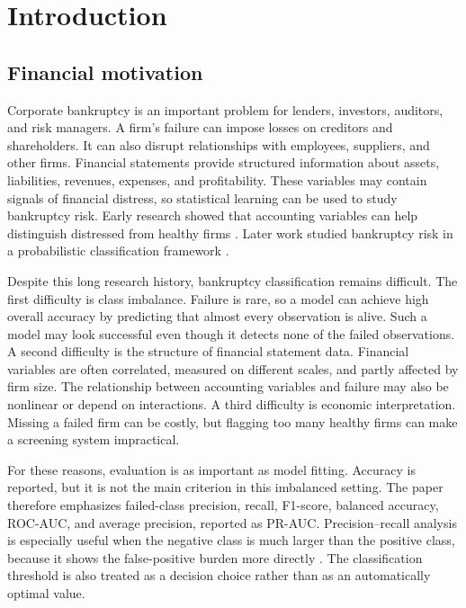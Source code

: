 \documentclass[11pt,a4paper]{article}
\begin{document}
\clearpage
\begingroup
\small
\setlength{\parskip}{0pt}
\tableofcontents
\endgroup
\clearpage
{}

\section{Introduction}
\label{sec:introduction}

\subsection{Financial motivation}

Corporate bankruptcy is an important problem for lenders, investors, auditors,
and risk managers. A firm's failure can impose losses on creditors and
shareholders. It can also disrupt relationships with employees, suppliers, and
other firms. Financial statements provide structured information about assets,
liabilities, revenues, expenses, and profitability. These variables may contain
signals of financial distress, so statistical learning can be used to study
bankruptcy risk. Early research showed
that accounting variables can help distinguish distressed from healthy firms
\citep{altman1968}. Later work studied bankruptcy risk in a probabilistic
classification framework \citep{ohlson1980}.

Despite this long research history, bankruptcy classification remains difficult.
The first difficulty is class imbalance. Failure is rare, so a model can achieve
high overall accuracy by predicting that almost every observation is alive. Such
a model may look successful even though it detects none of the failed
observations. A second difficulty is the structure of financial statement data.
Financial variables are often correlated, measured on different scales, and
partly affected by firm size. The relationship between accounting variables and
failure may also be nonlinear or depend on interactions. A third difficulty is
economic interpretation. Missing a failed firm can be costly, but flagging too
many healthy firms can make a screening system impractical.

For these reasons, evaluation is as important as model fitting. Accuracy is
reported, but it is not the main criterion in this imbalanced setting. The paper
therefore emphasizes failed-class precision, recall, F1-score, balanced
accuracy, ROC-AUC, and average precision, reported as PR-AUC. Precision--recall
analysis is especially useful when the negative class is much larger than the
positive class, because it shows the false-positive burden more directly
\citep{davis2006}. The classification threshold is also treated as a decision
choice rather than as an automatically optimal value.
\end{document}
